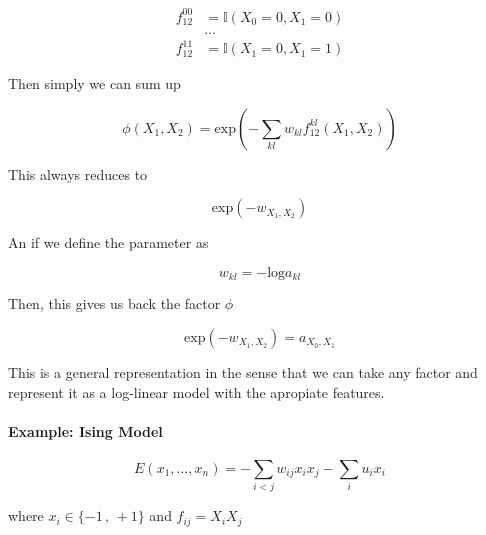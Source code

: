\begin{equation}
\begin{split}
 f_{12}^{00} & = \mathbb{I}(X_0 = 0, X_1=0)\\
 & \dots \\
 f_{12}^{11} & = \mathbb{I}(X_1 = 0, X_1=1)
\end{split} 
\end{equation}

Then simply we can sum up 

\begin{equation}
 \phi(X_1,X_2) = \text{exp}(-\sum_{kl} w_{kl} f_{12}^{kl}(X_1,X_2))
\end{equation}

This always reduces to 

\begin{equation}
\text{exp}(-w_{X_1,X_2}) 
\end{equation}

An if we define the parameter as 

\begin{equation}
 w_{kl} = -\text{log} a_{kl}
\end{equation}

Then, this gives us back the factor $\phi$

\begin{equation}
\text{exp}(-w_{X_1,X_2}) = a_{X_0,X_1}
\end{equation}

\begin{framed}
 \centering
This is a general representation in the sense that we can take any factor and represent it as a log-linear model with the apropiate features.
\end{framed} 

\paragraph{Example: Ising Model}

\begin{equation}
 E(x_1, \dots, x_n) = - \sum_{i<j} w_{ij} x_i x_j - \sum_i u_i x_i
\end{equation}

where $x_i \in \{-1 \, , \, +1 \} $ and $f_{ij} = X_i X_j$

